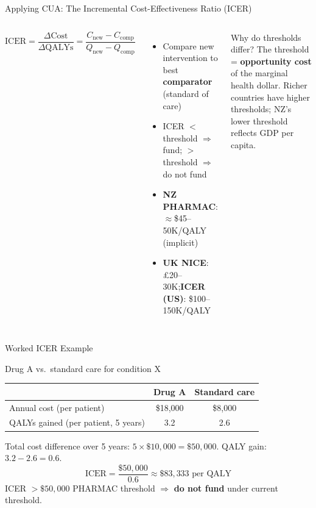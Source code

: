 \documentclass[aspectratio=169, 12pt]{beamer}
\begin{document}
\begin{frame}{Applying CUA: The Incremental Cost-Effectiveness Ratio (ICER)}
  \begin{columns}
      \small
      $\text{ICER} = \dfrac{\Delta \text{Cost}}{\Delta \text{QALYs}} = \dfrac{C_{\text{new}} - C_{\text{comp}}}{Q_{\text{new}} - Q_{\text{comp}}}$
      \vspace{0.2em}
      \begin{itemize}
        \item Compare new intervention to best \textbf{comparator} (standard of care)
        \item ICER $<$ threshold $\Rightarrow$ fund; $>$ threshold $\Rightarrow$ do not fund
        \item \textbf{NZ PHARMAC}: $\approx$\$45--50K/QALY (implicit)
        \item \textbf{UK NICE}: £20--30K;\quad \textbf{ICER (US)}: \$100--150K/QALY
      \end{itemize}
      \begin{exampleblock}{Why do thresholds differ?}
        \small The threshold = \textbf{opportunity cost} of the marginal health dollar. Richer countries have higher thresholds; NZ's lower threshold reflects GDP per capita.
      \end{exampleblock}
  \end{columns}
\end{frame}

\begin{frame}{Worked ICER Example}
  \begin{block}{Drug A vs.\ standard care for condition X}
    \small
    \begin{center}
      \begin{tabular}{@{}lcc@{}}
        \toprule
        & \textbf{Drug A} & \textbf{Standard care} \\
        \midrule
        Annual cost (per patient) & \$18,000 & \$8,000 \\
        QALYs gained (per patient, 5 years) & 3.2 & 2.6 \\
        \bottomrule
      \end{tabular}
    \end{center}
    \vspace{0.2em}
    Total cost difference over 5 years: $5 \times \$10{,}000 = \$50{,}000$. QALY gain: $3.2 - 2.6 = 0.6$.
    \[ \text{ICER} = \frac{\$50{,}000}{0.6} \approx \$83{,}333 \text{ per QALY} \]
    ICER $> \$50{,}000$ PHARMAC threshold $\Rightarrow$ \textbf{do not fund} under current threshold.
  \end{block}
\end{frame}
\end{document}
